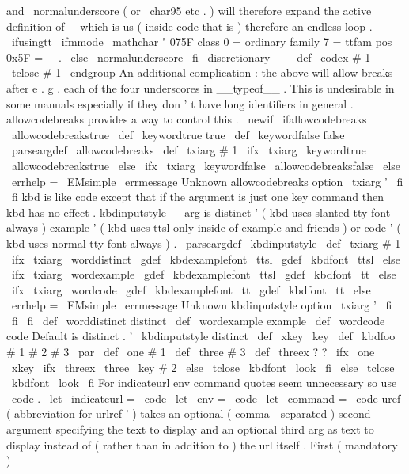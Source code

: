 {{and
\
normalunderscore
(
or
\
char95
etc
.
)
%
will
therefore
expand
the
active
definition
of
_
which
is
us
%
(
inside
code
that
is
)
therefore
an
endless
loop
.
\
ifusingtt
{
\
ifmmode
\
mathchar
"
075F
%
class
0
=
ordinary
family
7
=
ttfam
pos
0x5F
=
_
.
\
else
\
normalunderscore
\
fi
\
discretionary
{
}
{
}
{
}
}
%
{
\
_
}
%
}
\
def
\
codex
#
1
{
\
tclose
{
#
1
}
\
endgroup
}
%
An
additional
complication
:
the
above
will
allow
breaks
after
e
.
g
.
%
each
of
the
four
underscores
in
__typeof__
.
This
is
undesirable
in
%
some
manuals
especially
if
they
don
'
t
have
long
identifiers
in
%
general
.
allowcodebreaks
provides
a
way
to
control
this
.
%
\
newif
\
ifallowcodebreaks
\
allowcodebreakstrue
\
def
\
keywordtrue
{
true
}
\
def
\
keywordfalse
{
false
}
\
parseargdef
\
allowcodebreaks
{
%
\
def
\
txiarg
{
#
1
}
%
\
ifx
\
txiarg
\
keywordtrue
\
allowcodebreakstrue
\
else
\
ifx
\
txiarg
\
keywordfalse
\
allowcodebreaksfalse
\
else
\
errhelp
=
\
EMsimple
\
errmessage
{
Unknown
allowcodebreaks
option
\
txiarg
'
}
%
\
fi
\
fi
}
%
kbd
is
like
code
except
that
if
the
argument
is
just
one
key
command
%
then
kbd
has
no
effect
.
%
kbdinputstyle
-
-
arg
is
distinct
'
(
kbd
uses
slanted
tty
font
always
)
%
example
'
(
kbd
uses
ttsl
only
inside
of
example
and
friends
)
%
or
code
'
(
kbd
uses
normal
tty
font
always
)
.
\
parseargdef
\
kbdinputstyle
{
%
\
def
\
txiarg
{
#
1
}
%
\
ifx
\
txiarg
\
worddistinct
\
gdef
\
kbdexamplefont
{
\
ttsl
}
\
gdef
\
kbdfont
{
\
ttsl
}
%
\
else
\
ifx
\
txiarg
\
wordexample
\
gdef
\
kbdexamplefont
{
\
ttsl
}
\
gdef
\
kbdfont
{
\
tt
}
%
\
else
\
ifx
\
txiarg
\
wordcode
\
gdef
\
kbdexamplefont
{
\
tt
}
\
gdef
\
kbdfont
{
\
tt
}
%
\
else
\
errhelp
=
\
EMsimple
\
errmessage
{
Unknown
kbdinputstyle
option
\
txiarg
'
}
%
\
fi
\
fi
\
fi
}
\
def
\
worddistinct
{
distinct
}
\
def
\
wordexample
{
example
}
\
def
\
wordcode
{
code
}
%
Default
is
distinct
.
'
\
kbdinputstyle
distinct
\
def
\
xkey
{
\
key
}
\
def
\
kbdfoo
#
1
#
2
#
3
\
par
{
\
def
\
one
{
#
1
}
\
def
\
three
{
#
3
}
\
def
\
threex
{
?
?
}
%
\
ifx
\
one
\
xkey
\
ifx
\
threex
\
three
\
key
{
#
2
}
%
\
else
{
\
tclose
{
\
kbdfont
\
look
}
}
\
fi
\
else
{
\
tclose
{
\
kbdfont
\
look
}
}
\
fi
}
%
For
indicateurl
env
command
quotes
seem
unnecessary
so
use
\
code
.
\
let
\
indicateurl
=
\
code
\
let
\
env
=
\
code
\
let
\
command
=
\
code
%
uref
(
abbreviation
for
urlref
'
)
takes
an
optional
(
comma
-
separated
)
%
second
argument
specifying
the
text
to
display
and
an
optional
third
%
arg
as
text
to
display
instead
of
(
rather
than
in
addition
to
)
the
url
%
itself
.
First
(
mandatory
)
}
